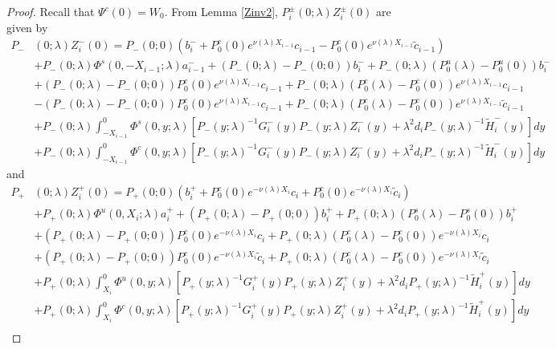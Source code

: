 \documentclass[thesis.tex]{subfiles}
\begin{document}
\begin{lemma}
\begin{proof}
Recall that $\Psi^c(0) = W_0$. From Lemma \ref{Zinv2}, $P_i^\pm(0; \lambda) Z_i^\pm(0)$ are given by
\begin{align*}
P_-&(0; \lambda) Z_i^-(0) = P_-(0; 0)( b_i^- + P_0^c(0) e^{\nu(\lambda) X_{i-1}} c_{i-1} - P_0^c(0) e^{\nu(\lambda) X_{i-1}} \tilde{c}_{i-1}) \\
&+ P_-(0; \lambda) \Phi^s(0, -X_{i-1}; \lambda) a_{i-1}^- + (P_-(0; \lambda) - P_-(0; 0))b_i^- + P_-(0; \lambda)(P_0^u(\lambda) - P_0^u(0))b_i^- \\
&+ (P_-(0; \lambda) - P_-(0; 0)) P_0^c(0) e^{\nu(\lambda) X_{i-1}} c_{i-1} + P_-(0; \lambda) (P_0^c(\lambda) - P_0^c(0)) e^{\nu(\lambda) X_{i-1}} c_{i-1} \\
&- (P_-(0; \lambda) - P_-(0; 0)) P_0^c(0) e^{\nu(\lambda) X_{i-1}} c_{i-1} + P_-(0; \lambda) (P_0^c(\lambda) - P_0^c(0)) e^{\nu(\lambda) X_{i-1}} \tilde{c}_{i-1} \\
&+ P_-(0; \lambda) \int_{-X_{i-1}}^0 \Phi^s(0, y; \lambda) [P_-(y; \lambda)^{-1} G_i^-(y) P_-(y; \lambda)Z_i^-(y) + \lambda^2 d_i P_-(y; \lambda)^{-1} \tilde{H}_i^-(y)] dy \\
&+ P_-(0; \lambda) \int_{-X_{i-1}}^0 \Phi^c(0, y; \lambda) [P_-(y; \lambda)^{-1} G_i^-(y) P_-(y; \lambda)Z_i^-(y) + \lambda^2 d_i P_-(y; \lambda)^{-1} \tilde{H}_i^-(y)] dy
\end{align*}
and
\begin{align*}
P_+&(0; \lambda) Z_i^+(0) = P_+(0; 0)( b_i^+ + P_0^c(0) e^{-\nu(\lambda)X_i} c_i + P_0^c(0) e^{-\nu(\lambda)X_i} \tilde{c}_i )\\
&+ P_+(0; \lambda) \Phi^u(0, X_i; \lambda) a_i^+ + (P_+(0; \lambda) - P_+(0; 0)) b_i^+ + P_+(0; \lambda) (P_0^s(\lambda) - P_0^s(0)) b_i^+ \\
&+ (P_+(0; \lambda) - P_+(0; 0))P_0^c(0) e^{-\nu(\lambda)X_i} c_i + P_+(0; \lambda) (P_0^c(\lambda) - P_0^c(0)) e^{-\nu(\lambda)X_i} c_i \\
&+ (P_+(0; \lambda) - P_+(0; 0))P_0^c(0) e^{-\nu(\lambda)X_i} \tilde{c}_i + P_+(0; \lambda) (P_0^c(\lambda) - P_0^c(0)) e^{-\nu(\lambda)X_i} \tilde{c}_i \\
&+ P_+(0; \lambda) \int_{X_i}^0 \Phi^u(0, y; \lambda) [P_+(y; \lambda)^{-1} G_i^+(y) P_+(y; \lambda) Z_i^+(y) + \lambda^2 d_i P_+(y; \lambda)^{-1} \tilde{H}_i^+(y)] dy \\
&+ P_+(0; \lambda) \int_{X_i}^0 \Phi^c(0, y; \lambda) [P_+(y; \lambda)^{-1} G_i^+(y) P_+(y; \lambda) Z_i^+(y) + \lambda^2 d_i P_+(y; \lambda)^{-1} \tilde{H}_i^+(y)] dy \\
\end{align*}


\end{proof}
\end{lemma}
\end{document}
